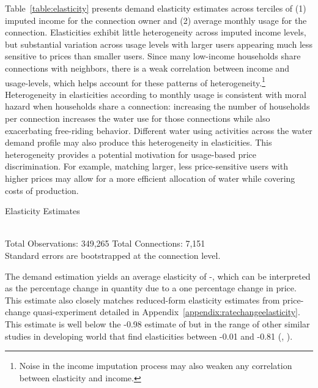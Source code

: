 \documentclass[12pt]{article}
\begin{document}
Table~\ref{table:elasticity} presents demand elasticity estimates across terciles of (1) imputed income for the connection owner and (2) average monthly usage for the connection.  Elasticities exhibit little heterogeneity across imputed income levels, but substantial variation across usage levels with larger users appearing much less sensitive to prices than smaller users.  Since many low-income households share connections with neighbors, there is a weak correlation between income and usage-levels, which helps account for these patterns of heterogeneity.\footnote{Noise in the income imputation process may also weaken any correlation between elasticity and income.}  Heterogeneity in elasticities according to monthly usage is consistent with moral hazard when households share a connection:  increasing the number of households per connection increases the water use for those connections while also exacerbating free-riding behavior.  Different water using activities across the water demand profile may also produce this heterogeneity in elasticities.  This heterogeneity provides a potential motivation for usage-based price discrimination.  For example, matching larger, less price-sensitive users with higher prices may allow for a more efficient allocation of water while covering costs of production.

\begin{table}
\centering
\caption{Elasticity Estimates}\label{table:elasticity}
 \\
\vspace{.5cm}
{\footnotesize Total Observations:  349,265   Total Connections:  7,151 \\
Standard errors are bootstrapped at the connection level.}
\end{table}

The demand estimation yields an average elasticity of -\unskip, which can be interpreted as the percentage change in quantity due to a one percentage change in price.  This estimate also closely matches reduced-form elasticity estimates from price-change quasi-experiment detailed in Appendix~\ref{appendix:ratechangeelasticity}.  This estimate is well below the -0.98 estimate of \cite{szabo2015value} but in the range of other similar studies in developing world that find elasticities between -0.01 and -0.81 (\cite{diakite2009proposal}, \cite{strand2005water}).  
\end{document}
